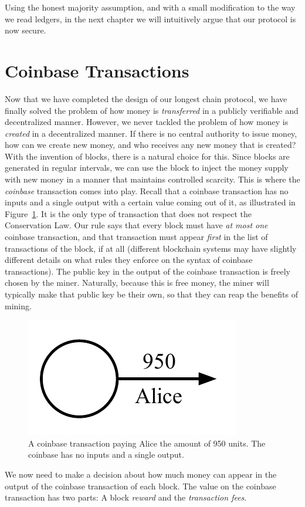 Using the honest majority assumption, and with a small modification to the way we read ledgers,
in the next chapter we will intuitively argue that our protocol is now secure.

\section{Coinbase Transactions}

Now that we have completed the design of our longest chain protocol, we have finally solved the
problem of how money is \emph{transferred} in a publicly verifiable and decentralized manner.
However, we never tackled the problem of how money is \emph{created} in a decentralized manner.
If there is no central authority to issue money, how can we create new money, and who receives
any new money that is created? With the invention of blocks, there is a natural choice for this.
Since blocks are generated in regular intervals, we can use the block to inject the money supply
with new money in a manner that maintains controlled scarcity.
This is where the \emph{coinbase} transaction comes into play.
Recall that a coinbase transaction has no inputs and a single output with a certain value coming
out of it, as illustrated in Figure~\ref{fig.coinbase}.
It is the only type of transaction that does not respect the Conservation Law.
Our rule says that every block
must have \emph{at most one} coinbase transaction, and that transaction must appear \emph{first} in
the list of transactions of the block, if at all (different blockchain systems may have slightly
different details on what rules they enforce on the syntax of coinbase transactions).
The public key in the output of the coinbase transaction is freely chosen by the miner.
Naturally, because this is free money, the miner will typically make that public key
be their own, so that they can reap the benefits of mining.

\begin{figure}[h]
    \centering
    \includegraphics[width=0.23 \columnwidth,keepaspectratio]{figures/coinbase.pdf}
    \caption{A coinbase transaction paying Alice the amount of 950 units. The coinbase has no inputs and a single output.}
    \label{fig.coinbase}
\end{figure}

We now need to make a decision about how much money can appear in the output of the coinbase
transaction of each block. The value on the coinbase transaction has two parts: A block \emph{reward}
and the \emph{transaction fees}.

